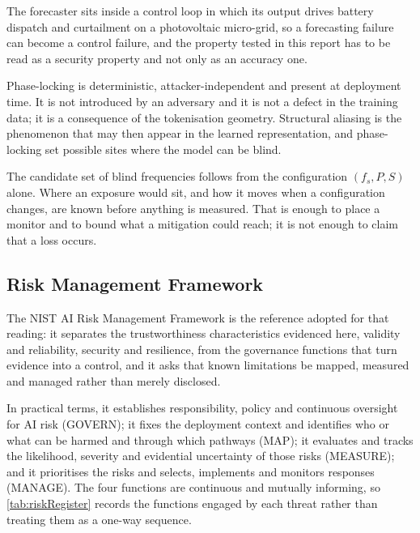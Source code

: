 The forecaster sits inside a control loop in which its output drives battery dispatch and curtailment on a photovoltaic micro-grid, so a forecasting failure can become a control failure, and the property tested in this report has to be read as a security property and not only as an accuracy one.

Phase-locking is deterministic, attacker-independent and present at deployment time. It is not introduced by an adversary and it is not a defect in the training data; it is a consequence of the tokenisation geometry. Structural aliasing is the phenomenon that may then appear in the learned representation, and phase-locking set possible sites where the model can be blind.

The candidate set of blind frequencies follows from the configuration $(f_s,P,S)$ alone. Where an exposure would sit, and how it moves when a configuration changes, are known before anything is measured. That is enough to place a monitor and to bound what a mitigation could reach; it is not enough to claim that a loss occurs.

\subsection{Risk Management Framework}
The NIST AI Risk Management Framework\autocite{tabassiArtificialIntelligenceRisk2023} is the reference adopted for that reading: it separates the trustworthiness characteristics evidenced here, validity and reliability, security and resilience, from the governance functions that turn evidence into a control, and it asks that known limitations be mapped, measured and managed rather than merely disclosed.

In practical terms, it establishes responsibility, policy and continuous oversight for AI risk (GOVERN); it fixes the deployment context and identifies who or what can be harmed and through which pathways (MAP); it evaluates and tracks the likelihood, severity and evidential uncertainty of those risks (MEASURE); and it prioritises the risks and selects, implements and monitors responses (MANAGE). The four functions are continuous and mutually informing, so \autoref{tab:riskRegister} records the functions engaged by each threat rather than treating them as a one-way sequence.

